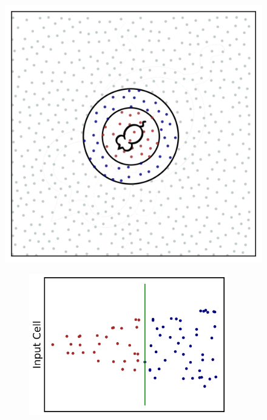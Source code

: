 \documentclass{article}
\begin{document}
    \begin{figure}[htbp]
        \centering
        
        \begin{minipage}[b]{0.59\textwidth}
            \centering
            \subcaption{}
            \includegraphics[width=\textwidth]{mouse_plot.png}
        \end{minipage}
        \begin{minipage}[b]{0.38\textwidth}
            \centering
            \begin{subfigure}{\textwidth}
                \subcaption{}
                \includegraphics[width=0.95\textwidth]{input_STDP_plot.png}
            \end{subfigure}
            

\end{minipage}
\end{figure}
\end{document}
